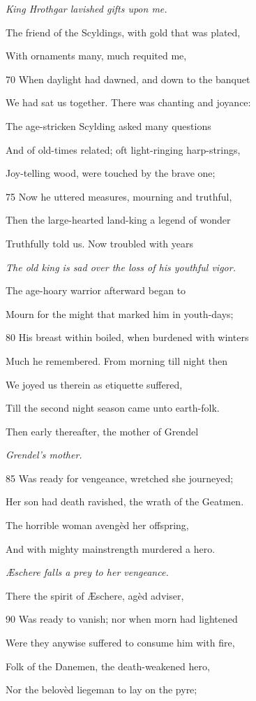 \emph{King Hrothgar
lavished gifts upon
me.}

The friend of the Scyldings, with gold that was plated,

With ornaments many, much requited me,

70
When daylight had dawned, and down to the banquet

We had sat us together. There was chanting and joyance:

The age-stricken Scylding asked many questions

And of old-times related; oft light-ringing harp-strings,

Joy-telling wood, were touched by the brave one;

75
Now he uttered measures, mourning and truthful,

Then the large-hearted land-king a legend of wonder

Truthfully told us. Now troubled with years

\emph{The old king is
sad over the loss
of his youthful
vigor.}

The age-hoary warrior afterward began to

Mourn for the might that marked him in youth-days;

80
His breast within boiled, when burdened with winters

Much he remembered. From morning till night then

We joyed us therein as etiquette suffered,

Till the second night season came unto earth-folk.

Then early thereafter, the mother of Grendel

\emph{Grendel’s mother.}

85
Was ready for vengeance, wretched she journeyed;

Her son had death ravished, the wrath of the Geatmen.

The horrible woman avengèd her offspring,

And with mighty mainstrength murdered a hero.

\emph{Æschere falls a
prey to her vengeance.}

There the spirit of Æschere, agèd adviser,

90
Was ready to vanish; nor when morn had lightened

Were they anywise suffered to consume him with fire,

Folk of the Danemen, the death-weakened hero,

Nor the belovèd liegeman to lay on the pyre;

